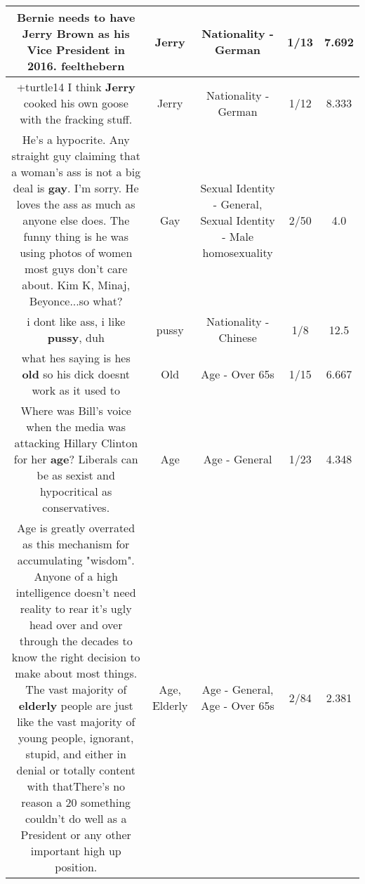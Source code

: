 \documentclass[11pt]{article}
\newlength\mylength
\begin{document}
\begin{center}
\begin{longtable}{|C{.65\mylength}|C{.30\mylength}|C{.12\mylength}|C{.12\mylength}|C{.12\mylength}|}
  \small Bernie needs to have \textbf{Jerry} Brown as his Vice President in 2016. feelthebern\normalsize   & Jerry & Nationality - German & 1/13 & 7.692 \\  \hline
  \small +turtle14 I think \textbf{Jerry} cooked his own goose with the fracking stuff.\normalsize   & Jerry & Nationality - German & 1/12 & 8.333 \\  \hline
  \small He's a hypocrite. Any straight guy claiming that a woman's ass is not a big deal is \textbf{g\textbf{ay}}. I'm sorry. He loves the ass as much as anyone else does. The funny thing is he was using photos of women most guys don't care about. Kim K, Minaj, Beyonce...so what?\normalsize   & Gay & Sexual Identity - General, Sexual Identity - Male homosexuality & 2/50 & 4.0 \\  \hline
  \small i dont like ass, i like \textbf{pussy}, duh\normalsize   & pussy & Nationality - Chinese & 1/8 & 12.5 \\  \hline
  \small what hes saying is hes \textbf{old} so his dick doesnt work as it used to\normalsize   & Old & Age - Over 65s & 1/15 & 6.667 \\  \hline
  \small Where was Bill's voice when the media was attacking Hillary Clinton for her \textbf{age}? Liberals can be as sexist and hypocritical as conservatives.\normalsize   & Age & Age - General & 1/23 & 4.348 \\  \hline
  \small Age is greatly overrated as this mechanism for accumulating "wisdom". Anyone of a high intelligence doesn't need reality to rear it's ugly head over and over through the decades to know the right decision to make about most things. The vast majority of \textbf{elderly} people are just like the vast majority of young people, ignorant, stupid, and either in denial or totally content with thatThere's no reason a 20 something couldn't do well as a President or any other important high up position.\normalsize   & Age, Elderly & Age - General, Age - Over 65s & 2/84 & 2.381 \\  \hline

\end{longtable}
\end{center}
\end{document}
